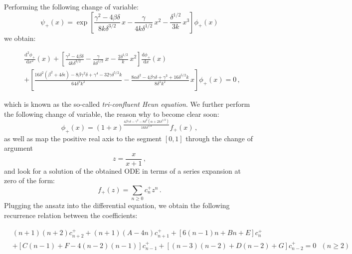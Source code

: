 \documentclass[reprint, amsmath, amssymb, aps, prl]{revtex4-2}
\begin{document}
    Performing the following change of variable:
    \begin{equation}
        \psi_+(x)=\exp\left[\frac{\gamma^2-4\beta\delta}{8k\delta^{3/2}}\,x-\frac{\gamma}{4k\delta^{1/2}}\,x^2-\frac{\delta^{1/2}}{3k}\,x^3\right]\phi_+(x)
    \end{equation}
    we obtain:
    \begin{widetext}
    \begin{equation}
    \begin{split}
        &\frac{\text{d}^2\phi_+}{\text{d}x^2}(x)+\left[\frac{\gamma^2-4\beta\delta}{4k\delta^{3/2}}-\frac{\gamma}{k\delta^{1/2}}\,x-\frac{2\delta^{1/2}}{k}\,x^2\right]\frac{\text{d}\phi_+}{\text{d}x}(x)\\
        &+\left[\frac{16 \delta ^2 \left(\beta ^2+4 \delta  \epsilon \right)-8 \beta  \gamma ^2 \delta +\gamma ^4-32 \gamma  \delta ^{5/2} k}{64 \delta ^3 k^2}-\frac{8 \alpha  \delta ^2-4 \beta  \gamma  \delta +\gamma ^3+16 \delta ^{5/2} k}{8 \delta ^2 k^2}\,x\right]\phi_+(x)=0\,,
    \end{split}
    \end{equation}
    \end{widetext}
    which is known as the so-called \textit{tri-confluent Heun equation}.
    We further perform the following change of variable, the reason why to become clear soon:
    \begin{equation}
    \label{eq:change_variable}
        \phi_+(x)=(1+x)^{\frac{4 \beta  \gamma  \delta -\gamma ^3-8 \delta ^2 \left(\alpha +2k \delta^{1/2} \right)}{16k \delta ^{5/2}}}f_+(x)\,,
    \end{equation}
    as well as map the positive real axis to the segment $[0,1]$ through the change of argument
    \begin{equation}
        z=\frac{x}{x+1}\,,
    \end{equation}
    and look for a solution of the obtained ODE in terms of a series expansion at zero of the form:
    \begin{equation}
        f_+(z)=\sum_{n\geq 0}c^+_nz^n\,.
    \end{equation}
    Plugging the ansatz into the differential equation, we obtain the following recurrence relation between the coefficients:
    \begin{widetext}
    \begin{equation}
    \begin{split}
        &(n+1)(n+2) c^+_{n+2}+(n+1)(A -4n)c^+_{n+1} +[6(n-1) n+B n+E]c^+_n \\
        &+[C (n-1)+F-4(n-2) (n-1)]c^+_{n-1} + [(n-3) (n-2)+D (n-2)+G]c^+_{n-2}=0\ \ \ (n\geq 2)
    \end{split}
    \end{equation}
    \end{widetext}
\end{document}
